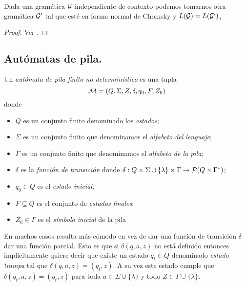 \documentclass[tesis.tex]{subfiles}
\begin{document}
\begin{prop}
	Dada una gramática $\cal G$ independiente de contexto podemos tomarnos otra gramática $\cal G'$ tal que esté en forma normal de Chomsky y $L({\cal G}) = L(\cal G')$,
\end{prop}

\begin{proof}
	Ver \cite{hopcraft-ullman}.
\end{proof}

\subsection{Autómatas de pila.}

\begin{deff}
	Un \emph{autómata de pila finito no determinístico} es una tupla 
	\[
	{\cal M } = (Q, \Sigma, Z, \delta, q_0, F, Z_0)
	\]
	donde 
	\begin{itemize}
		\item $Q$ es un conjunto finito denominado los \emph{estados};
		\item $\Sigma$ es un conjunto finito que denominamos el \emph{alfabeto del lenguaje};
		\item $\Gamma$ es un conjunto finito que denominamos el \emph{alfabeto de la pila};
		\item $\delta$ es la \emph{función de transición} donde $\delta: Q  \times \Sigma \cup \{ \lambda \} \times \Gamma \to {\cal P}( Q  \times \Gamma^*)$;
		\item $q_0 \in Q$ es el \emph{estado inicial};
		\item $F \subseteq Q$ es el conjunto de \emph{estados finales};
		\item $Z_{0} \in \Gamma$ es el \emph{símbolo inicial} de la pila
	\end{itemize}
\end{deff}




\begin{obs}
	En muchos casos resulta más cómodo en vez de dar una función de transición $\delta$ dar una función parcial.
	Esto es que si $\delta(q,a,z)$ no está definido entonces implícitamente quiere decir que existe un estado $q_{t} \in Q$ denominado \emph{estado trampa} tal que $\delta(q,a,z) = (q_{t}, z)$.
	A su vez este estado cumple que $\delta(q_{t},a,z) = (q_{t},z)$ para toda $a \in \Sigma \cup \{ \lambda \}$ y todo $Z \in \Gamma \cup \{ \lambda \}$.
\end{obs}
\end{document}

